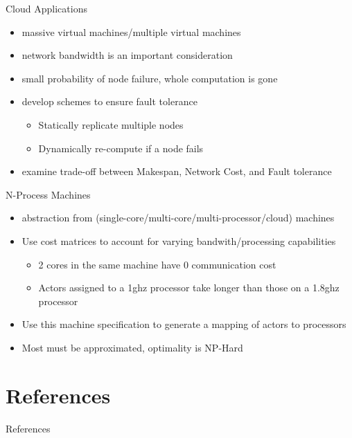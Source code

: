 \documentclass{beamer}
\begin{document}
\begin{frame}{Cloud Applications}
\begin{itemize}
	\item massive virtual machines/multiple virtual machines
	\item network bandwidth is an important consideration
	\item small probability of node failure, whole computation is gone
	\item develop schemes to ensure fault tolerance
	\begin{itemize}
		\item Statically replicate multiple nodes
		\item Dynamically re-compute if a node fails
	\end{itemize}
	\item examine trade-off between Makespan, Network Cost, and Fault tolerance
\end{itemize}
\end{frame}

\begin{frame}{N-Process Machines}
\begin{itemize}
	\item abstraction from (single-core/multi-core/multi-processor/cloud) machines
	\item Use cost matrices to account for varying bandwith/processing capabilities
	\begin{itemize}
		\item 2 cores in the same machine have 0 communication cost
		\item Actors assigned to a 1ghz processor take longer than those on a 1.8ghz processor
	\end{itemize}
	\item Use this machine specification to generate a mapping of actors to processors
	\item Most must be approximated, optimality is NP-Hard
\end{itemize}
\end{frame}

\section{References}
\begin{frame}[allowframebreaks]{References}


\end{frame}
\end{document}
